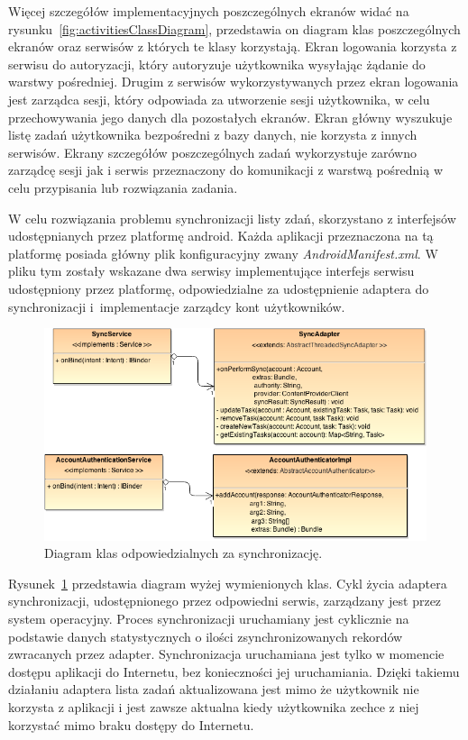 Więcej szczegółów implementacyjnych poszczególnych ekranów widać na rysunku~\ref{fig:activitiesClassDiagram}, przedstawia on diagram klas poszczególnych ekranów oraz serwisów z których te klasy korzystają. Ekran logowania korzysta z serwisu do autoryzacji, który autoryzuje użytkownika wysyłając żądanie do warstwy pośredniej. Drugim z serwisów wykorzystywanych przez ekran logowania jest zarządca sesji, który odpowiada za utworzenie sesji użytkownika, w celu przechowywania jego danych dla pozostałych ekranów. Ekran główny wyszukuje listę zadań użytkownika bezpośredni z bazy danych, nie korzysta z innych serwisów. Ekrany szczegółów poszczególnych zadań wykorzystuje zarówno zarządcę sesji jak i serwis przeznaczony do komunikacji z warstwą pośrednią w celu przypisania lub rozwiązania zadania. 

W celu rozwiązania problemu synchronizacji listy zdań, skorzystano z interfejsów udostępnianych przez platformę android. Każda aplikacji przeznaczona na tą platformę posiada główny plik konfiguracyjny zwany \textit{AndroidManifest.xml}. W pliku tym zostały wskazane dwa serwisy implementujące interfejs serwisu udostępniony przez platformę, odpowiedzialne za udostępnienie adaptera do synchronizacji i~implementacje zarządcy kont użytkowników. 
\begin{figure}[h]
\centerline{\includegraphics[scale=0.6]{androidSyncClasses}}
\caption{Diagram klas odpowiedzialnych za synchronizację.}
\label{fig:androidSyncClasses}
\end{figure}

Rysunek~\ref{fig:androidSyncClasses} przedstawia diagram wyżej wymienionych klas. Cykl życia adaptera synchronizacji, udostępnionego przez odpowiedni serwis, zarządzany jest przez system operacyjny. Proces synchronizacji uruchamiany jest cyklicznie na podstawie danych statystycznych o ilości zsynchronizowanych rekordów zwracanych przez adapter. Synchronizacja uruchamiana jest tylko w momencie dostępu aplikacji do Internetu, bez konieczności jej uruchamiania. Dzięki takiemu działaniu adaptera lista zadań aktualizowana jest mimo że użytkownik nie korzysta z aplikacji i jest zawsze aktualna kiedy użytkownika zechce z niej korzystać mimo braku dostępy do Internetu.


